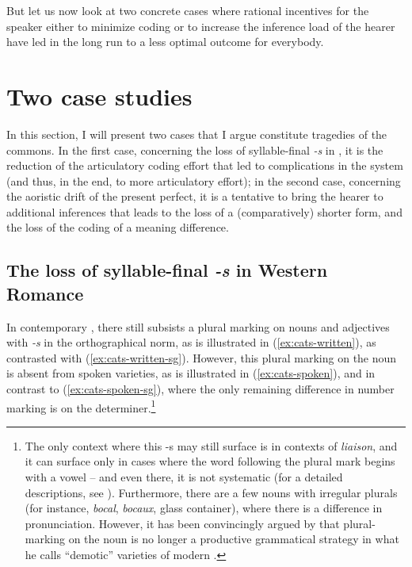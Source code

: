 \documentclass[output=paper,hidelinks]{langscibook}
\begin{document}
But let us now look at two concrete cases where rational incentives for the speaker either to minimize coding or to increase the inference load of the hearer have led in the long run to a less optimal outcome for everybody.

\section{Two case studies}
\label{sec:two-case-studies}

In this section, I will present two cases that I argue constitute tragedies of the commons. In the first case, concerning the loss of syllable-final \emph{-s} in , it is the reduction of the articulatory coding effort that led to complications in the system (and thus, in the end, to more articulatory effort); in the second case, concerning the aoristic drift of the present perfect, it is a tentative to bring the hearer to additional inferences that leads to the loss of a (comparatively) shorter form, and the loss of the coding of a meaning difference.

\subsection{The loss of syllable-final \emph{-s} in Western Romance}\largerpage
\label{sec:loss-syllable-final}

In contemporary , there still subsists a plural marking on nouns and adjectives with \emph{-s} in the orthographical norm, as is illustrated in (\ref{ex:cats-written}), as contrasted with (\ref{ex:cats-written-sg}). However, this plural marking on the noun is absent from spoken varieties, as is illustrated in (\ref{ex:cats-spoken}), and in contrast to (\ref{ex:cats-spoken-sg}), where the only remaining difference in number marking is on the determiner.\footnote{The only context where this -s may still surface is in contexts of \emph{liaison}, and it can surface only in cases where the word following the plural mark begins with a vowel -- and even there, it is not systematic (for a detailed descriptions, see \citealt{massot08}). Furthermore, there are a few nouns with irregular plurals (for instance, \emph{bocal}, \emph{bocaux}, glass container), where there is a difference in pronunciation. However, it has been convincingly argued by \citet{massot08} that plural-marking on the noun is no longer a productive grammatical strategy in what he calls ``demotic'' varieties of modern .} 
\end{document}
